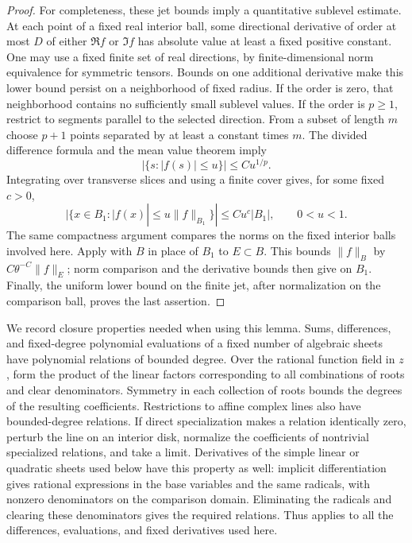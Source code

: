 \begin{proof}
For completeness, these jet bounds imply a quantitative sublevel
estimate.  At each point of a fixed real interior ball, some directional
derivative of order at most \(D\) of either \(\Re f\) or \(\Im f\) has
absolute value at least a fixed positive constant.  One may use a fixed
finite set of real directions, by finite-dimensional norm equivalence
for symmetric tensors.  Bounds on one additional derivative make this
lower bound persist on a neighborhood of fixed radius.  If the order
is zero, that neighborhood contains no sufficiently small sublevel
values.  If the order is \(p\ge1\), restrict to segments parallel to
the selected direction.  From a subset of length \(m\) choose \(p+1\)
points separated by at least a constant times \(m\).  The divided
difference formula and the mean value theorem imply
\[
 |\{s:|f(s)|\le u\}|\le C u^{1/p}.
\]
Integrating over transverse slices and using a finite cover gives,
for some fixed \(c>0\),
\begin{equation}
 |\{x\in B_1:|f(x)|\le u\|f\|_{B_1}\}|
 \le C u^c |B_1|,\qquad 0<u<1.
 \label{a02:algebraic-sublevel}
\end{equation}
The same compactness argument compares the norms on the fixed
interior balls involved here.  Apply 
with \(B\) in place of \(B_1\) to \(E\subset B\).  This bounds
\(\|f\|_B\) by \(C\theta^{-C}\|f\|_E\); norm comparison and
the derivative bounds then give  on \(B_1\).
Finally, the uniform lower bound on the
finite jet, after normalization on the comparison ball, proves the
last assertion.
\end{proof}

We record closure properties needed when using this lemma.  Sums,
differences, and fixed-degree polynomial evaluations of a fixed number
of algebraic sheets have polynomial relations of bounded degree.
Over the rational function field in \(z\), form the product of the
linear factors corresponding to all combinations of roots and clear
denominators.  Symmetry in each collection of roots bounds the degrees
of the resulting coefficients.  Restrictions to affine complex lines
also have bounded-degree relations.  If direct specialization makes
a relation identically zero, perturb the line on an interior disk,
normalize the coefficients of nontrivial specialized relations, and
take a limit.  Derivatives of the simple linear or quadratic sheets
used below have this property as well: implicit differentiation gives
rational expressions in the base variables and the same radicals,
with nonzero denominators on the comparison domain.  Eliminating the
radicals and clearing these denominators gives the required relations.
Thus  applies to all the differences,
evaluations, and fixed derivatives used here.

